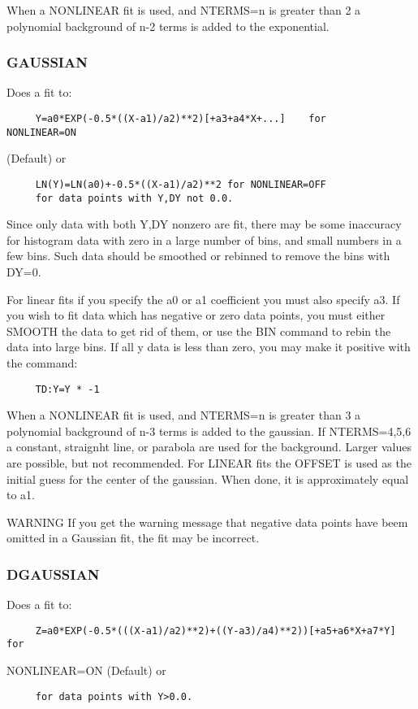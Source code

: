 When  a  NONLINEAR  fit  is  used,  and  NTERMS=n  is  greater than 2 a
polynomial background of n-2 terms is added to the exponential.  
\subsubsection{GAUSSIAN    }
Does a fit to:  
\begin{verbatim}
     Y=a0*EXP(-0.5*((X-a1)/a2)**2)[+a3+a4*X+...]    for    NONLINEAR=ON
\end{verbatim}
(Default) or 
\begin{verbatim}
     LN(Y)=LN(a0)+-0.5*((X-a1)/a2)**2 for NONLINEAR=OFF 
     for data points with Y,DY not 0.0.  
\end{verbatim}

Since  only  data  with  both  Y,DY  nonzero are fit, there may be some
inaccuracy for histogram data with zero in a large number of bins,  and
small  numbers in a few bins.  Such data should be smoothed or rebinned
to remove the bins with DY=0.  

For  linear  fits if you specify the a0 or a1 coefficient you must also
specify a3.  If you wish to fit data which has negative  or  zero  data
points,  you must either SMOOTH the data to get rid of them, or use the
BIN command to rebin the data into large bins.  If all y data  is  less
than zero, you may make it positive with the command:  
\begin{verbatim}
     TD:Y=Y * -1 
\end{verbatim}

When  a  NONLINEAR  fit  is  used,  and  NTERMS=n  is  greater than 3 a
polynomial background of n-3  terms  is  added  to  the  gaussian.   If
NTERMS=4,5,6  a  constant, straignht line, or parabola are used for the
background.  Larger values are possible, but not recommended.  
For  LINEAR fits the OFFSET is used as the initial guess for the center
of the gaussian.  When done, it is approximately equal to a1.  

WARNING  If  you get the warning message that negative data points have
beem omitted in a Gaussian fit, the fit may be incorrect.  
\subsubsection{DGAUSSIAN   }
Does a fit to:  
\begin{verbatim}
     Z=a0*EXP(-0.5*(((X-a1)/a2)**2)+((Y-a3)/a4)**2))[+a5+a6*X+a7*Y] for
\end{verbatim}
NONLINEAR=ON (Default) or 
\begin{verbatim}
     for data points with Y>0.0.  
\end{verbatim}

